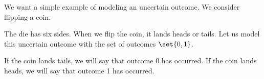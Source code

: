

We want a simple example of
modeling an uncertain outcome.
We consider flipping a coin.


The die has six sides.
When we flip the coin,
it lands heads or tails.
Let us model this uncertain
outcome with the set of outcomes
$\set{0, 1}$.

If the coin lands tails, we will
say that outcome 0 has occurred.
If the coin lands heads, we will
say that outcome 1 has occurred.
